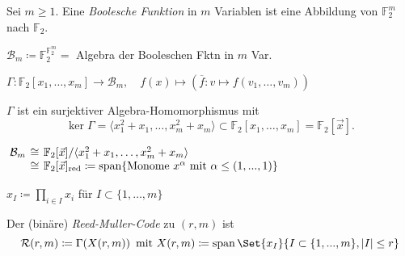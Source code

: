 \documentclass{cheat-sheet}
\newcommand{\F}{\mathbb{F}} %
\DeclareMathOperator{\spann}{span} %
\newcommand{\RM}{\mathcal{R}} %
\begin{document}


\begin{defn}
  Sei $m \geq 1$.
  Eine \emph{Boolesche Funktion} in $m$ Variablen ist eine Abbildung von $\F_2^m$ nach $\F_2$.
\end{defn}

\begin{nota}
  $\mathcal{B}_m \coloneqq \F_2^{\F_2^m} = $ Algebra der Booleschen Fktn in $m$ Var.
\end{nota}

\begin{defn}
  $
    \Gamma : \F_2[x_1, \ldots, x_m] \to \mathcal{B}_m, \quad
    f(x) \mapsto (\overline{f} : v \mapsto f(v_1, \ldots, v_m))
  $
\end{defn}


\begin{satz}
  $\Gamma$ ist ein surjektiver Algebra-Homomorphismus mit
  \[ \ker \Gamma = \langle x_1^2 + x_1, \ldots, x_m^2 + x_m \rangle \subset \F_2[x_1, \ldots, x_m] = \F_2[\vec{x}]. \]
\end{satz}

\begin{kor}
  $
    \arraycolsep=2pt
    \begin{array}[t]{r c l}
      \mathcal{B}_m & \cong & \F_2[\vec{x}] / \langle x_1^2 + x_1, \ldots, x_m^2 + x_m \rangle \\
      & \cong & \F_2[\vec{x}]_{\text{red}} \coloneqq \text{span} \{ \text{Monome } x^\alpha \text{ mit } \alpha \leq (1, \nldots, 1) \}
    \end{array}
  $
\end{kor}


\begin{nota}
  $x_I \coloneqq \prod_{i \in I} x_i$ für $I \subset \{ 1, \ldots, m \}$
\end{nota}

\begin{defn}
  Der (binäre) \emph{Reed-Muller-Code} zu $(r, m)$ ist
  \[
    \RM(r, m) \coloneqq \Gamma(X(r, m))
    \enspace \text{mit }
    X(r, m) \coloneqq \spann \Set{x_I}{I \subset \{ 1, \nldots, m \}, \abs{I} \leq r}
  \]
\end{defn}
\end{document}
